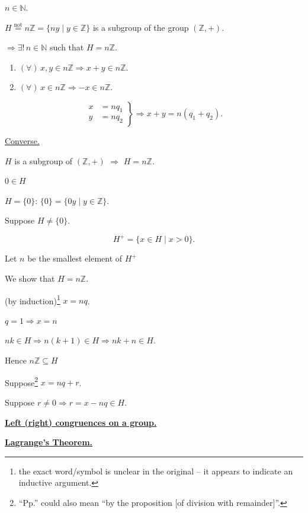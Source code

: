 \noindent $n\in\mathbb{N}$.

\bigskip
\noindent $H \overset{\text{not}}{=} n\mathbb{Z} = \{ny \mid y\in\mathbb{Z}\}$ is a subgroup of the group $(\mathbb{Z},+)$.

\noindent $\Rightarrow \exists!\, n\in\mathbb{N}$ such that $H=n\mathbb{Z}$.

\begin{enumerate}
\item[1)] $(\forall)\, x,y\in n\mathbb{Z} \Rightarrow x+y\in n\mathbb{Z}$.
\item[2)] $(\forall)\, x\in n\mathbb{Z} \Rightarrow -x\in n\mathbb{Z}$.
\end{enumerate}

\[
\left.\begin{aligned}
x&=nq_1\\
y&=nq_2
\end{aligned}\right\} \Rightarrow x+y = n(q_1+q_2).
\]

\bigskip
\noindent\underline{Converse.}

\noindent $H$ is a subgroup of $(\mathbb{Z},+)$ $\Rightarrow$ $H=n\mathbb{Z}$.

\noindent $0\in H$

\noindent $H=\{0\}$: \quad $\{0\} = \{0y \mid y\in\mathbb{Z}\}$.

\noindent Suppose $H\neq\{0\}$.

\[
H^+ = \{x\in H \mid x>0\}.
\]

\noindent Let $n$ be the smallest element of $H^+$

\noindent We show that $H=n\mathbb{Z}$.

\bigskip
\noindent (by induction)\footnote{the exact word/symbol is unclear in the original -- it appears to indicate an inductive argument.} $x=nq$.

\noindent $q=1 \Rightarrow x=n$

\noindent $nk\in H \Rightarrow n(k+1)\in H \Rightarrow nk+n\in H$.

\noindent Hence $n\mathbb{Z}\subseteq H$

\bigskip
\noindent Suppose\footnote{``Pp.'' could also mean ``by the proposition [of division with remainder]''.} $x=nq+r$.

\noindent Suppose $r\neq 0 \Rightarrow r=x-nq\in H$.

\bigskip
\noindent\underline{\textbf{Left (right) congruences on a group.}}

\noindent\underline{\textbf{Lagrange's Theorem.}}

